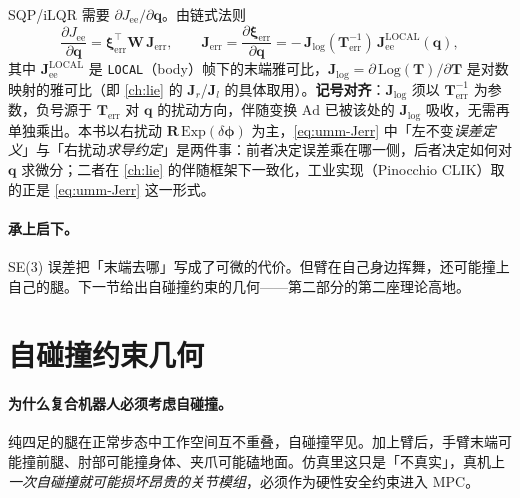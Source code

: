 \begin{derivation}
SQP/iLQR 需要 $\partial J_{\text{ee}}/\partial\mathbf q$。由链式法则
\begin{equation}
  \frac{\partial J_{\text{ee}}}{\partial\mathbf q}=\boldsymbol\xi_{\text{err}}^\top\mathbf W\,\mathbf J_{\text{err}},
  \qquad
  \mathbf J_{\text{err}}=\frac{\partial\boldsymbol\xi_{\text{err}}}{\partial\mathbf q}
  =-\,\mathbf J_{\log}(\mathbf T_{\text{err}}^{-1})\,\mathbf J_{\text{ee}}^{\text{LOCAL}}(\mathbf q),
  \label{eq:umm-Jerr}
\end{equation}
其中 $\mathbf J_{\text{ee}}^{\text{LOCAL}}$ 是 \texttt{LOCAL}（body）帧下的末端雅可比，$\mathbf J_{\log}=\partial\,\mathrm{Log}(\mathbf T)/\partial\mathbf T$ 是对数映射的雅可比（即 \cref{ch:lie} 的 $\mathbf J_r$/$\mathbf J_l$ 的具体取用）。\textbf{记号对齐}：$\mathbf J_{\log}$ 须以 $\mathbf T_{\text{err}}^{-1}$ 为参数，负号源于 $\mathbf T_{\text{err}}$ 对 $\mathbf q$ 的扰动方向，伴随变换 $\mathrm{Ad}$ 已被该处的 $\mathbf J_{\log}$ 吸收，无需再单独乘出。本书以右扰动 $\mathbf R\,\mathrm{Exp}(\delta\boldsymbol\phi)$ 为主，\cref{eq:umm-Jerr} 中「左不变\emph{误差定义}」与「右扰动\emph{求导约定}」是两件事：前者决定误差乘在哪一侧，后者决定如何对 $\mathbf q$ 求微分；二者在 \cref{ch:lie} 的伴随框架下一致化，工业实现（Pinocchio CLIK）取的正是 \cref{eq:umm-Jerr} 这一形式。
\end{derivation}

\paragraph{承上启下。}
SE(3) 误差把「末端去哪」写成了可微的代价。但臂在自己身边挥舞，还可能撞上自己的腿。下一节给出自碰撞约束的几何——第二部分的第二座理论高地。

\section{自碰撞约束几何}
\label{sec:umm-collision}

\paragraph{为什么复合机器人必须考虑自碰撞。}
纯四足的腿在正常步态中工作空间互不重叠，自碰撞罕见。加上臂后，手臂末端可能撞前腿、肘部可能撞身体、夹爪可能磕地面。仿真里这只是「不真实」，真机上\emph{一次自碰撞就可能损坏昂贵的关节模组}，必须作为硬性安全约束进入 MPC。


